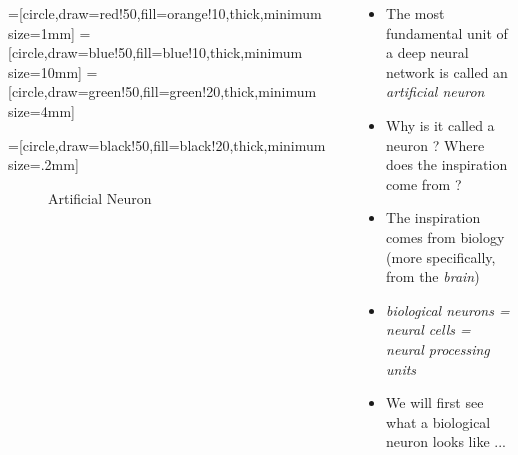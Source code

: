 \documentclass[serif, aspectratio=169]{beamer}
\begin{document}
\begin{frame}

	\begin{columns}

		\begin{overlayarea}{\textwidth}{\textheight}

			=[circle,draw=red!50,fill=orange!10,thick,minimum size=1mm]
			=[circle,draw=blue!50,fill=blue!10,thick,minimum size=10mm]
			=[circle,draw=green!50,fill=green!20,thick,minimum size=4mm]

			=[circle,draw=black!50,fill=black!20,thick,minimum size=.2mm]

			\begin{figure}
				\centering
				\caption{Artificial Neuron}
			\end{figure}
		\end{overlayarea}

		\begin{overlayarea}{\textwidth}{\textheight}

			\begin{itemize}
				\justifying
				\item<1-> The most fundamental unit of a deep neural network is called an \textit{artificial neuron}
				\item<2-> Why is it called a neuron ? Where does the inspiration come from ?
				\item<3-> The inspiration comes from biology (more specifically, from the \textit{brain})
				\item<4-> \textit{biological neurons = neural cells = neural processing units}
				\item<5-> We will first see what a biological neuron looks like ...

			\end{itemize}
		\end{overlayarea}
	\end{columns}
\end{frame}
\end{document}
